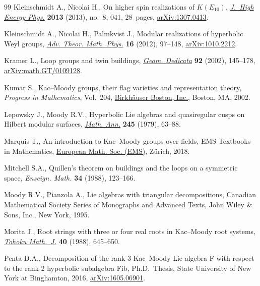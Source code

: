 \documentclass[pdftex]{sigma}
\numberwithin{equation}{section}
\begin{document}
\begin{thebibliography}{99}
Kleinschmidt A., Nicolai H., On higher spin realizations of {$K(E_{10})$},
 \href{https://doi.org/10.1007/JHEP08(2013)041}{\textit{J.~High Energy Phys.}} \textbf{2013} (2013), no.~8, 041, 28~pages, \href{https://arxiv.org/abs/1307.0413}{arXiv:1307.0413}.

Kleinschmidt A., Nicolai H., Palmkvist J., Modular realizations of hyperbolic
 {W}eyl groups, \href{https://doi.org/10.4310/ATMP.2012.v16.n1.a4}{\textit{Adv. Theor. Math. Phys.}} \textbf{16} (2012), 97--148,
 \href{https://arxiv.org/abs/1010.2212}{arXiv:1010.2212}.

Kramer L., Loop groups and twin buildings, \href{https://doi.org/10.1023/A:1019603827308}{\textit{Geom. Dedicata}} \textbf{92}
 (2002), 145--178, \href{https://arxiv.org/abs/math.GT/0109128}{arXiv:math.GT/0109128}.

Kumar S., Kac--{M}oody groups, their flag varieties and representation theory,
 \textit{Progress in Mathematics}, Vol.~204, \href{https://doi.org/10.1007/978-1-4612-0105-2}{Birkh\"auser Boston, Inc.},
 Boston, MA, 2002.

Lepowsky J., Moody R.V., Hyperbolic {L}ie algebras and quasiregular cusps on
 {H}ilbert modular surfaces, \href{https://doi.org/10.1007/BF01420431}{\textit{Math. Ann.}} \textbf{245} (1979), 63--88.

Marquis T., An introduction to {K}ac--{M}oody groups over fields, EMS Textbooks
 in Mathematics, \href{https://doi.org/10.4171/187}{European Math. Soc. (EMS)}, Z\"urich, 2018.

Mitchell S.A., Quillen's theorem on buildings and the loops on a symmetric
 space, \textit{Enseign. Math.} \textbf{34} (1988), 123--166.

Moody R.V., Pianzola A., Lie algebras with triangular decompositions, Canadian
 Mathematical Society Series of Monographs and Advanced Texts, John Wiley \&
 Sons, Inc., New York, 1995.

Morita J., Root strings with three or four real roots in {K}ac--{M}oody root
 systems, \href{https://doi.org/10.2748/tmj/1178227928}{\textit{Tohoku Math.~J.}} \textbf{40} (1988), 645--650.

Penta D.A., Decomposition of the rank 3 {K}ac--{M}oody {L}ie algebra {F} with
 respect to the rank 2 hyperbolic subalgebra {F}ib, Ph.D.~Thesis, {S}tate
 University of New York at Binghamton, 2016, \href{https://arxiv.org/abs/1605.06901}{arXiv:1605.06901}.


\end{thebibliography}
\end{document}
